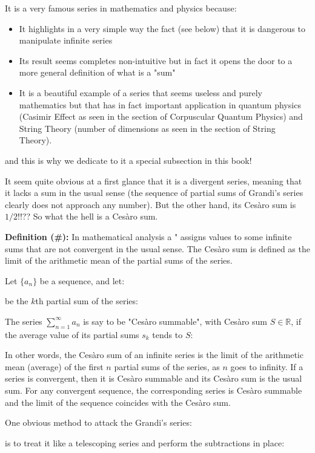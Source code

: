 	It is a very famous series in mathematics and physics because:
	\begin{itemize}
		\item It highlights in a very simple way the fact (see below) that it is dangerous to manipulate infinite series
		
		\item Its result seems completes non-intuitive but in fact it opens the door to a more general definition of what is a "sum"
		
		\item It is a beautiful example of a series that seems useless and purely mathematics but that has in fact important application in quantum physics (Casimir Effect as seen in the section of Corpuscular Quantum Physics) and String Theory (number of dimensions as seen in the section of String Theory).
	\end{itemize}
	and this is why we dedicate to it a special subsection in this book!
	
	It seem quite obvious at a first glance that it is a divergent series, meaning that it lacks a sum in the usual sense (the sequence of partial sums of Grandi's series clearly does not approach any number). But the other hand, its Cesàro sum is $1/2$!!?? So what the hell is a Cesàro sum.
	
	\textbf{Definition (\#\mydef):} In mathematical analysis a " assigns values to some infinite sums that are not convergent in the usual sense. The Cesàro sum is defined as the limit of the arithmetic mean of the partial sums of the series.
	
	Let $\{a_n\}$ be a sequence, and let:
	
	be the $k$th partial sum of the series:
	
	The series $\sum _{n=1}^{\infty }a_{n}$ is say to be "Cesàro summable", with Cesàro sum $S\in\mathbb{R}$, if the average value of its partial sums $s_k$ tends to $S$:
	
	In other words, the Cesàro sum of an infinite series is the limit of the arithmetic mean (average) of the first $n$ partial sums of the series, as $n$ goes to infinity. If a series is convergent, then it is Cesàro summable and its Cesàro sum is the usual sum. For any convergent sequence, the corresponding series is Cesàro summable and the limit of the sequence coincides with the Cesàro sum.
	
	One obvious method to attack the Grandi's series:
	
	is to treat it like a telescoping series and perform the subtractions in place:
	
